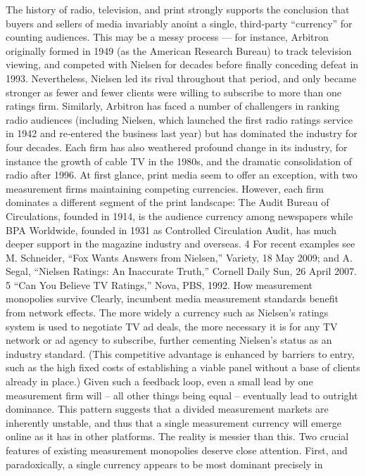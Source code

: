 The history of radio, television, and print strongly supports the conclusion
that buyers and sellers of media invariably anoint a single, third‐party
``currency'' for counting audiences. This may be a messy process — for
instance, Arbitron originally formed in 1949 (as the American Research
Bureau) to track television viewing, and competed with Nielsen for
decades before finally conceding defeat in 1993. Nevertheless, Nielsen led
its rival throughout that period, and only became stronger as fewer and
fewer clients were willing to subscribe to more than one ratings firm.
Similarly, Arbitron has faced a number of challengers in ranking radio
audiences (including Nielsen, which launched the first radio ratings
service in 1942 and re‐entered the business last year) but has dominated
the industry for four decades. Each firm has also weathered profound
change in its industry, for instance the growth of cable TV in the 1980s,
and the dramatic consolidation of radio after 1996.
At first glance, print media seem to offer an exception, with two
measurement firms maintaining competing currencies. However, each
firm dominates a different segment of the print landscape: The Audit
Bureau of Circulations, founded in 1914, is the audience currency among
newspapers while BPA Worldwide, founded in 1931 as Controlled
Circulation Audit, has much deeper support in the magazine industry and
overseas.
4 For recent examples see M. Schneider, ``Fox Wants Answers from Nielsen,'' Variety,
18 May 2009; and A. Segal, ``Nielsen Ratings: An Inaccurate Truth,'' Cornell Daily
Sun, 26 April 2007.
5 ``Can You Believe TV Ratings,'' Nova, PBS, 1992.
How measurement monopolies survive
Clearly, incumbent media measurement standards benefit from network
effects. The more widely a currency such as Nielsen’s ratings system is
used to negotiate TV ad deals, the more necessary it is for any TV network
or ad agency to subscribe, further cementing Nielsen’s status as an
industry standard. (This competitive advantage is enhanced by barriers to
entry, such as the high fixed costs of establishing a viable panel without a
base of clients already in place.) Given such a feedback loop, even a small
lead by one measurement firm will – all other things being equal –
eventually lead to outright dominance. This pattern suggests that a
divided measurement markets are inherently unstable, and thus that a
single measurement currency will emerge online as it has in other
platforms.
The reality is messier than this. Two crucial features of existing
measurement monopolies deserve close attention. First, and
paradoxically, a single currency appears to be most dominant precisely in
